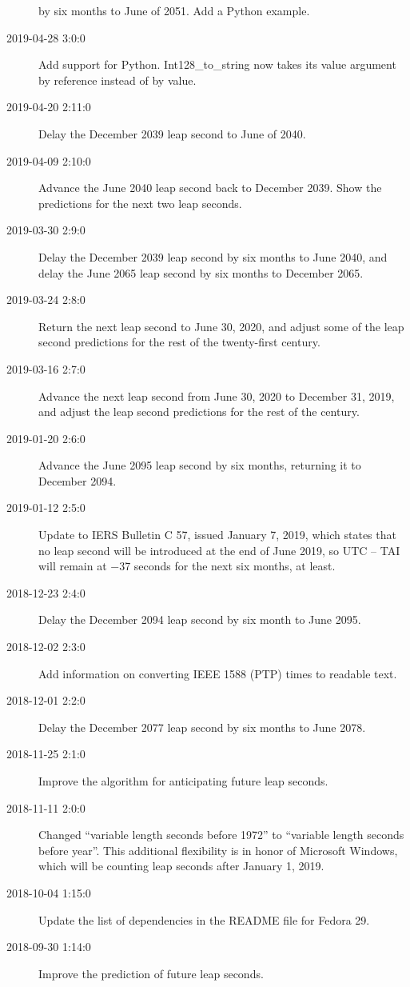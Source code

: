 \documentclass[letterpaper,twoside]{article}
\begin{document}
\begin{description}
  by six months to June of 2051.  Add a Python example.
\item[2019-04-28 3:0:0] Add support for Python.  Int128\_to\_string
  now takes its value argument by reference instead of by value.
\item[2019-04-20 2:11:0] Delay the December 2039 leap second
  to June of 2040.
\item[2019-04-09 2:10:0] Advance the June 2040 leap second back to
  December 2039.  Show the predictions for the next two leap seconds.
\item[2019-03-30 2:9:0] Delay the December 2039 leap second by six
  months to June 2040, and delay the June 2065 leap second by six
  months to December 2065.
\item[2019-03-24 2:8:0] Return the next leap second to June 30, 2020,
  and adjust some of the leap second predictions for the rest of the
  twenty-first century.
\item[2019-03-16 2:7:0] Advance the next leap second from June 30, 2020
  to December 31, 2019, and adjust the leap second predictions
  for the rest of the century.
\item[2019-01-20 2:6:0] Advance the June 2095 leap second by six
  months, returning it to December 2094.
\item[2019-01-12 2:5:0] Update to IERS Bulletin C 57, issued January
  7, 2019, which states that no leap second will be introduced
  at the end of June 2019, so UTC -- TAI will remain at
  \num{-37} seconds for the next six months, at least.  
\item[2018-12-23 2:4:0] Delay the December 2094 leap second by six month
  to June 2095.
\item[2018-12-02 2:3:0] Add information on converting IEEE 1588 (PTP)
  times to readable text.
\item[2018-12-01 2:2:0] Delay the December 2077 leap second by
  six months to June 2078.
\item[2018-11-25 2:1:0] Improve the algorithm for anticipating future
  leap seconds.
\item[2018-11-11 2:0:0] Changed ``variable length seconds before 1972''
  to ``variable length seconds before year''.  This additional flexibility
  is in honor of Microsoft Windows, which will be counting leap seconds
  after January 1, 2019.
\item[2018-10-04 1:15:0] Update the list of dependencies in the
  README file for Fedora 29.
\item[2018-09-30 1:14:0] Improve the prediction of future leap seconds.

\end{description}
\end{document}
